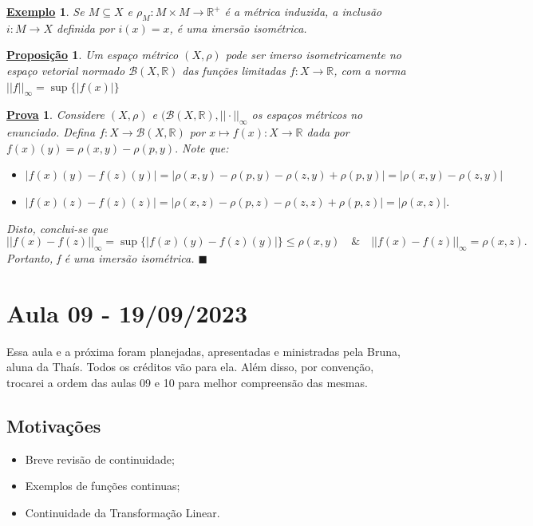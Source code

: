\documentclass{article}
\newtheorem*{prop*}{\underline{Proposi\c c\~ao}}
\newtheorem{example}{\underline{Exemplo}}
\newtheorem*{proof*}{\underline{Prova}}
\renewcommand\qedsymbol{$\blacksquare$}
\begin{document}
 \begin{example}
   Se \(M\subseteq{X}\) e \(\rho _{M}:M\times M\rightarrow \mathbb{R}^{+}\) é a métrica induzida, a inclusão
\(i:M\rightarrow X\) definida por \(i(x) = x\), é uma imersão isométrica.
 \end{example}
 \begin{prop*}
   Um espaço métrico \((X, \rho )\) pode ser imerso isometricamente no espaço vetorial normado \(\mathcal{B}(X, \mathbb{R})\) das funções limitadas \(f:X\rightarrow \mathbb{R}\), com a norma
  \(||f||_{\infty}=\sup\{|f(x)|\}\)
 \end{prop*}
 \begin{proof*}
   Considere \((X, \rho )\) e \((\mathcal{B}(X, \mathbb{R}), ||\cdot ||_{\infty}\) os espaços métricos no enunciado. Defina
 \(f:X\rightarrow \mathcal{B}(X, \mathbb{R})\) por \(x\mapsto f(x):X\rightarrow \mathbb{R}\) dada por 
 \(f(x)(y) = \rho (x, y)-\rho (p, y).\) Note que:
\begin{itemize}
  \item[i)] \(|f(x)(y) - f(z)(y)| = |\rho (x, y)-\rho (p, y)-\rho (z, y) + \rho (p, y)| = |\rho (x, y)-\rho (z, y)|\)
  \item[ii)] \(|f(x)(z)-f(z)(z)| = |\rho (x, z) - \rho (p, z) - \rho (z, z) + \rho (p,z)| = |\rho (x, z)|.\)
\end{itemize}
  Disto, conclui-se que 
    \[
      ||f(x)-f(z)||_{\infty} = \sup\{|f(x)(y) - f(z)(y)|\}\leq \rho (x, y)\quad\&\quad ||f(x)-f(z)||_{\infty} = \rho (x, z).
    \]
  Portanto, f é uma imersão isométrica. \qedsymbol
 \end{proof*}
\newpage

\section{Aula 09 - 19/09/2023}
  Essa aula e a próxima foram planejadas, apresentadas e ministradas pela Bruna, aluna da Thaís. Todos os créditos vão para ela.
Além disso, por convenção, trocarei a ordem das aulas 09 e 10 para melhor compreensão das mesmas.
\subsection{Motivações}
\begin{itemize}
  \item Breve revisão de continuidade;
  \item Exemplos de funções continuas;
  \item Continuidade da Transformação Linear.
\end{itemize}
\end{document}
